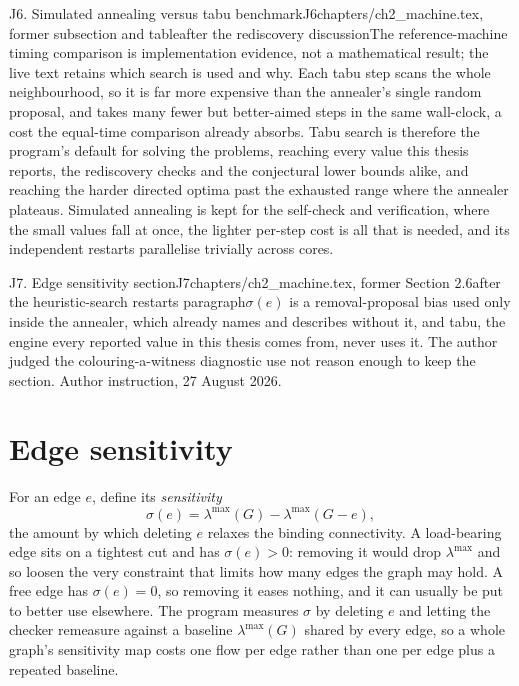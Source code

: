 \begin{offcut}{J6. Simulated annealing versus tabu benchmark}{J6}{chapters/ch2\_machine.tex, former subsection and table}{after the rediscovery discussion}{The reference-machine timing comparison is implementation evidence, not a mathematical result; the live text retains which search is used and why.}
Each tabu step scans the whole neighbourhood, so it is far more expensive than the annealer's single random proposal, and takes many fewer but better-aimed steps in the same wall-clock, a cost the equal-time comparison already absorbs. Tabu search is therefore the program's default for solving the problems, reaching every value this thesis reports, the rediscovery checks and the conjectural lower bounds alike, and reaching the harder directed optima past the exhausted range where the annealer plateaus. Simulated annealing is kept for the self-check and verification, where the small values fall at once, the lighter per-step cost is all that is needed, and its independent restarts parallelise trivially across cores.
\end{offcut}

\begin{offcut}{J7. Edge sensitivity section}{J7}{chapters/ch2\_machine.tex, former Section 2.6}{after the heuristic-search restarts paragraph}{$\sigma(e)$ is a removal-proposal bias used only inside the annealer, which  already names and describes without it, and tabu, the engine every reported value in this thesis comes from, never uses it. The author judged the colouring-a-witness diagnostic use not reason enough to keep the section. Author instruction, 27 August 2026.}
\section{Edge sensitivity}

For an edge $e$, define its \emph{sensitivity}
\[
    \sigma(e) = \lambda^{\max}(G) - \lambda^{\max}(G - e),
\]
the amount by which deleting $e$ relaxes the binding connectivity. A load-bearing edge sits on a tightest cut and has $\sigma(e) > 0$: removing it would drop $\lambda^{\max}$ and so loosen the very constraint that limits how many edges the graph may hold. A free edge has $\sigma(e) = 0$, so removing it eases nothing, and it can usually be put to better use elsewhere. The program measures $\sigma$ by deleting $e$ and letting the checker remeasure against a baseline $\lambda^{\max}(G)$ shared by every edge, so a whole graph's sensitivity map costs one flow per edge rather than one per edge plus a repeated baseline.


\end{offcut}
